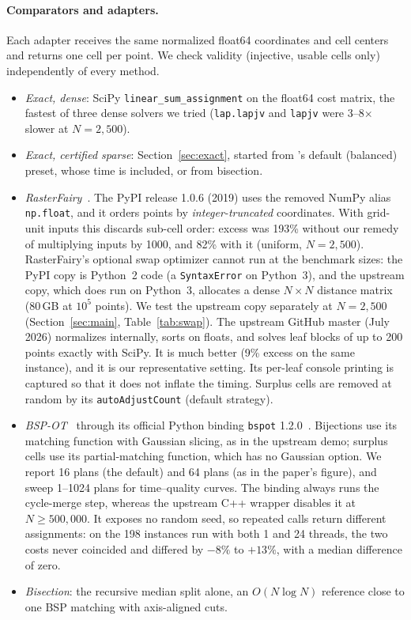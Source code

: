 \paragraph{Comparators and adapters.} Each adapter receives the same normalized
float64 coordinates and cell centers and returns one cell per point. We check validity
(injective, usable cells only) independently of every method.
\begin{itemize}
\item \emph{Exact, dense}: SciPy \texttt{linear\_sum\_assignment} on the float64 cost matrix,
  the fastest of three dense solvers we tried (\texttt{lap.lapjv} and \texttt{lapjv} were 3--8$\times$
  slower at $N=2{,}500$).
\item \emph{Exact, certified sparse}: Section~\ref{sec:exact}, started from \ShuffleSnap's
  default (balanced) preset, whose time is included, or from bisection.
\item \emph{RasterFairy}~\citep{klingemann2015rasterfairy}. The PyPI release 1.0.6 (2019)
  uses the removed NumPy alias \texttt{np.float}, and it orders points by
  \emph{integer-truncated} coordinates. With grid-unit inputs this discards sub-cell order:
  excess was 193\% without our remedy of multiplying inputs by 1000, and 82\% with it
  (uniform, $N=2{,}500$). RasterFairy's optional swap optimizer cannot run at the benchmark sizes: the PyPI copy is
  Python~2 code (a \texttt{SyntaxError} on Python~3), and the upstream copy, which does run
  on Python~3, allocates a dense $N\times N$ distance matrix (80\,GB at $10^5$ points). We test
  the upstream copy separately at $N=2{,}500$ (Section~\ref{sec:main}, Table~\ref{tab:swap}). The upstream GitHub master (July 2026)
  normalizes internally, sorts on floats, and solves leaf blocks of up to 200 points
  exactly with SciPy. It is much better (9\% excess on the same instance), and it is our
  representative setting. Its per-leaf console printing is captured so that it does not
  inflate the timing. Surplus cells are removed at random by its \texttt{autoAdjustCount}
  (default strategy).
\item \emph{BSP-OT}~\citep{genest2025bspot} through its official Python binding \texttt{bspot}
  1.2.0~\citep{takayama2026bspotpython}. Bijections use its matching function with Gaussian
  slicing, as in the upstream demo; surplus cells use its partial-matching function, which
  has no Gaussian option. We report 16 plans (the default)
  and 64 plans (as in the paper's figure), and sweep 1--1024 plans for time--quality
  curves. The binding always runs the cycle-merge step, whereas the upstream C++ wrapper
  disables it at $N\ge500{,}000$. It exposes no random seed, so repeated calls return
  different assignments: on the 198 instances run with both 1 and 24 threads, the two costs
  never coincided and differed by $-8\%$ to $+13\%$, with a median difference of zero.
\item \emph{Bisection}: the recursive median split alone, an $O(N\log N)$ reference close to
  one BSP matching with axis-aligned cuts.
\end{itemize}

